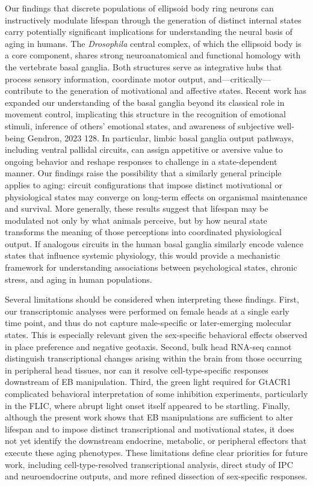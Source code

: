 Our findings that discrete populations of ellipsoid body ring neurons can instructively modulate lifespan through the generation of distinct internal states carry potentially significant implications for understanding the neural basis of aging in humans. The \textit{Drosophila} central complex, of which the ellipsoid body is a core component, shares strong neuroanatomical and functional homology with the vertebrate basal ganglia. Both structures serve as integrative hubs that process sensory information, coordinate motor output, and—critically—contribute to the generation of motivational and affective states. Recent work has expanded our understanding of the basal ganglia beyond its classical role in movement control, implicating this structure in the recognition of emotional stimuli, inference of others' emotional states, and awareness of subjective well-being {Gendron, 2023 128}. In particular, limbic basal ganglia output pathways, including ventral pallidal circuits, can assign appetitive or aversive value to ongoing behavior and reshape responses to challenge in a state-dependent manner. Our findings raise the possibility that a similarly general principle applies to aging: circuit configurations that impose distinct motivational or physiological states may converge on long-term effects on organismal maintenance and survival. More generally, these results suggest that lifespan may be modulated not only by what animals perceive, but by how neural state transforms the meaning of those perceptions into coordinated physiological output. If analogous circuits in the human basal ganglia similarly encode valence states that influence systemic physiology, this would provide a mechanistic framework for understanding associations between psychological states, chronic stress, and aging in human populations.

Several limitations should be considered when interpreting these findings. First, our transcriptomic analyses were performed on female heads at a single early time point, and thus do not capture male-specific or later-emerging molecular states. This is especially relevant given the sex-specific behavioral effects observed in place preference and negative geotaxis. Second, bulk head RNA-seq cannot distinguish transcriptional changes arising within the brain from those occurring in peripheral head tissues, nor can it resolve cell-type-specific responses downstream of EB manipulation. Third, the green light required for GtACR1 complicated behavioral interpretation of some inhibition experiments, particularly in the FLIC, where abrupt light onset itself appeared to be startling. Finally, although the present work shows that EB manipulations are sufficient to alter lifespan and to impose distinct transcriptional and motivational states, it does not yet identify the downstream endocrine, metabolic, or peripheral effectors that execute these aging phenotypes. These limitations define clear priorities for future work, including cell-type-resolved transcriptional analysis, direct study of IPC and neuroendocrine outputs, and more refined dissection of sex-specific responses.